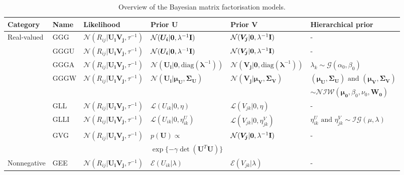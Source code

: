 \documentclass[letterpaper]{article} %
\newcommand{\U}{\boldsymbol U}
\newcommand{\Ui}{\boldsymbol{U_i}}
\newcommand{\V}{\boldsymbol V}
\newcommand{\Vj}{\boldsymbol{V_j}}
\begin{document}
	\begin{table*}[t]
		\caption{Overview of the Bayesian matrix factorisation models.} \label{overview_bmf_models}
		\centering
		\begin{tabular}{llllll}
			\toprule
			Category & Name & Likelihood \hspace{2pt} & Prior $\U$ & Prior $\V$ & Hierarchical prior \\
			\midrule
			Real-valued & GGG & $\mathcal{N} (R_{ij} | \Ui \Vj, \tau^{-1} )$ & $\mathcal{N} ( \Ui | \boldsymbol 0, \lambda^{-1} \text{\textbf I} )$ & $\mathcal{N} ( \Vj | \boldsymbol 0, \lambda^{-1} \text{\textbf I} )$ & - \\
			& GGGU & $\mathcal{N} (R_{ij} | \Ui \Vj, \tau^{-1} )$ & $\mathcal{N} ( \Ui | \boldsymbol 0, \lambda^{-1} \text{\textbf I} )$ & $\mathcal{N} ( \Vj | \boldsymbol 0, \lambda^{-1} \text{\textbf I} )$ & - \\
			& GGGA & $\mathcal{N} (R_{ij} | \Ui \Vj, \tau^{-1} )$ & $\mathcal{N} ( \Ui | \boldsymbol 0, \text{diag}(\boldsymbol \lambda^{-1}) )$ & $\mathcal{N} ( \Vj| \boldsymbol 0, \text{diag}(\boldsymbol \lambda^{-1}) )$ & $\lambda_k \sim \mathcal{G} ( \alpha_0, \beta_0 )$ \\
			& GGGW & $\mathcal{N} (R_{ij} | \Ui \Vj, \tau^{-1} )$ & $\mathcal{N} ( \Ui | \boldsymbol{\mu_U}, \boldsymbol{\Sigma_U})$ & $\mathcal{N} ( \Vj | \boldsymbol{\mu_V}, \boldsymbol{\Sigma_V})$ & $(\boldsymbol{\mu_U}, \boldsymbol{\Sigma_U}) \text{ and } (\boldsymbol{\mu_V}, \boldsymbol{\Sigma_V}) $ \\
			& & & & & $\sim \mathcal{NIW} ( \boldsymbol{\mu_0}, \beta_0, \nu_0, \boldsymbol{W_0} )$ \\
			& GLL & $\mathcal{N} (R_{ij} | \Ui \Vj, \tau^{-1} )$ & $\mathcal{L} ( U_{ik} | 0, \eta ) $ & $\mathcal{L} ( V_{jk} | 0, \eta ) $ & - \\
			& GLLI & $\mathcal{N} (R_{ij} | \Ui \Vj, \tau^{-1} )$ & $\mathcal{L} ( U_{ik} | 0, \eta^U_{ik} ) $ & $\mathcal{L} ( V_{jk} | 0, \eta^V_{jk} ) $ & $\eta^U_{ik} \text{ and } \eta^V_{jk} \sim \mathcal{IG}(\mu, \lambda) $ \\
			& GVG & $\mathcal{N} (R_{ij} | \Ui \Vj, \tau^{-1} )$ & $p(\U) \propto $ & $\mathcal{N} ( \Vj | \boldsymbol 0, \lambda^{-1} \text{\textbf I} )$ & - \\
			& & & $\exp \lbrace - \gamma \det (\U^T \U) \rbrace$ & & \\
			\midrule
			Nonnegative & GEE & $\mathcal{N} (R_{ij} | \Ui \Vj, \tau^{-1} )$ & $\mathcal{E} ( U_{ik} | \lambda )$ & $\mathcal{E} ( V_{jk} | \lambda )$ & - \\

\end{tabular}
\end{table*}
\end{document}

